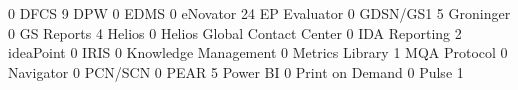\documentclass{article}
\begin{document}
\begin{Schunk}
\begin{Soutput}
                                                        0 
                                                     DFCS 
                                                        9 
                                                      DPW 
                                                        0 
                                                     EDMS 
                                                        0 
                                                 eNovator 
                                                       24 
                                             EP Evaluator 
                                                        0 
                                                 GDSN/GS1 
                                                        5 
                                                Groninger 
                                                        0 
                                               GS Reports 
                                                        4 
                                                   Helios 
                                                        0 
                             Helios Global Contact Center 
                                                        0 
                                            IDA Reporting 
                                                        2 
                                                ideaPoint 
                                                        0 
                                                     IRIS 
                                                        0 
                                     Knowledge Management 
                                                        0 
                                          Metrics Library 
                                                        1 
                                             MQA Protocol 
                                                        0 
                                                Navigator 
                                                        0 
                                                  PCN/SCN 
                                                        0 
                                                     PEAR 
                                                        5 
                                                 Power BI 
                                                        0 
                                          Print on Demand 
                                                        0 
                                                    Pulse 
                                                        1 

\end{Soutput}
\end{Schunk}
\end{document}
